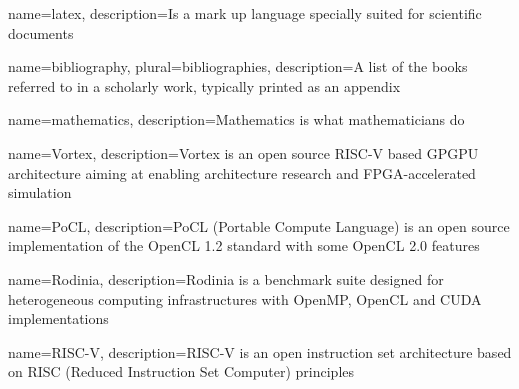 

\makeglossaries %


{
        name=latex,
        description={Is a mark up language specially suited for
scientific documents}
}

{
        name=bibliography,
        plural=bibliographies,
        description={A list of the books referred to in a scholarly work,
typically printed as an appendix}
}

{
    name=mathematics,
    description={Mathematics is what mathematicians do}
}

{
    name=Vortex,
    description={Vortex is an open source RISC-V based GPGPU architecture aiming at enabling architecture research and FPGA-accelerated simulation}
}

{
    name=PoCL,
    description={PoCL (Portable Compute Language) is an open source implementation of the OpenCL 1.2 standard with some OpenCL 2.0 features}
}

{
    name=Rodinia,
    description={Rodinia is a benchmark suite designed for heterogeneous computing infrastructures with OpenMP, OpenCL and CUDA implementations}
}

{
    name=RISC-V,
    description={RISC-V is an open instruction set architecture based on RISC (Reduced Instruction Set Computer) principles}
}


